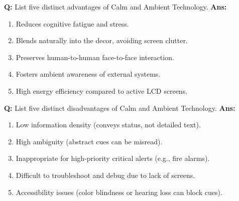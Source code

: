 \documentclass[10pt,a4paper,twocolumn]{article}
\begin{document}
\begin{tcolorbox}[
  colback=white,
  colframe=UnitColorTwo,
  colbacktitle=gray!10!white,
  coltitle=black,
  fonttitle=\bfseries\sffamily\small,
  title={Unit II $\bullet$ Card 8},
  boxrule=1.2pt,
  arc=2mm,
  outer arc=2mm,
  boxsep=1.5mm,
  top=1mm,
  bottom=1mm,
  left=1.5mm,
  right=1.5mm,
  before skip=2.5mm,
  after skip=2.5mm
]
\textbf{Q:} List five distinct advantages of Calm and Ambient Technology.
\tcbline
\textbf{Ans:} \begin{enumerate}
  \item Reduces cognitive fatigue and stress.
  \item Blends naturally into the decor, avoiding screen clutter.
  \item Preserves human-to-human face-to-face interaction.
  \item Fosters ambient awareness of external systems.
  \item High energy efficiency compared to active LCD screens.
\end{enumerate}
\end{tcolorbox}


\begin{tcolorbox}[
  colback=white,
  colframe=UnitColorTwo,
  colbacktitle=gray!10!white,
  coltitle=black,
  fonttitle=\bfseries\sffamily\small,
  title={Unit II $\bullet$ Card 9},
  boxrule=1.2pt,
  arc=2mm,
  outer arc=2mm,
  boxsep=1.5mm,
  top=1mm,
  bottom=1mm,
  left=1.5mm,
  right=1.5mm,
  before skip=2.5mm,
  after skip=2.5mm
]
\textbf{Q:} List five distinct disadvantages of Calm and Ambient Technology.
\tcbline
\textbf{Ans:} \begin{enumerate}
  \item Low information density (conveys status, not detailed text).
  \item High ambiguity (abstract cues can be misread).
  \item Inappropriate for high-priority critical alerts (e.g., fire alarms).
  \item Difficult to troubleshoot and debug due to lack of screens.
  \item Accessibility issues (color blindness or hearing loss can block cues).
\end{enumerate}
\end{tcolorbox}
\end{document}

